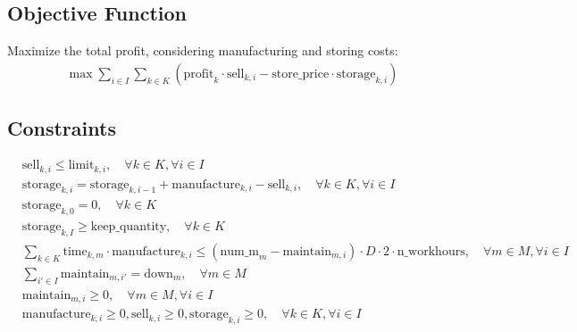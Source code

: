\documentclass{article}
\begin{document}
\subsection*{Objective Function}
Maximize the total profit, considering manufacturing and storing costs:
\begin{align*}
    \max \sum_{i \in I} \sum_{k \in K} \left( \text{profit}_k \cdot \text{sell}_{k, i} - \text{store\_price} \cdot \text{storage}_{k, i} \right)
\end{align*}

\subsection*{Constraints}
\begin{align*}
    & \text{sell}_{k, i} \leq \text{limit}_{k, i}, \quad \forall k \in K, \forall i \in I \\
    & \text{storage}_{k, i} = \text{storage}_{k, i-1} + \text{manufacture}_{k, i} - \text{sell}_{k, i}, \quad \forall k \in K, \forall i \in I \\
    & \text{storage}_{k, 0} = 0, \quad \forall k \in K \\
    & \text{storage}_{k, I} \geq \text{keep\_quantity}, \quad \forall k \in K \\
    & \sum_{k \in K} \text{time}_{k, m} \cdot \text{manufacture}_{k, i} \leq \left( \text{num\_m}_m - \text{maintain}_{m, i} \right) \cdot D \cdot 2 \cdot \text{n\_workhours}, \quad \forall m \in M, \forall i \in I \\
    & \sum_{i' \in I} \text{maintain}_{m, i'} = \text{down}_m, \quad \forall m \in M \\
    & \text{maintain}_{m, i} \geq 0, \quad \forall m \in M, \forall i \in I \\
    & \text{manufacture}_{k, i} \geq 0, \text{sell}_{k, i} \geq 0, \text{storage}_{k, i} \geq 0, \quad \forall k \in K, \forall i \in I
\end{align*}
\end{document}

